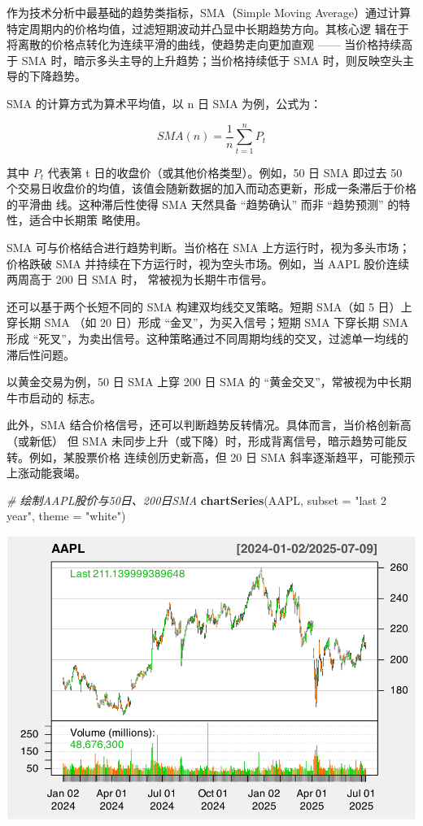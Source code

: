 \documentclass[]{ctexbook}
\newenvironment{Shaded}{\begin{snugshade}}{\end{snugshade}}
\newcommand{\AttributeTok}[1]{\textcolor[rgb]{0.13,0.29,0.53}{#1}}
\newcommand{\CommentTok}[1]{\textcolor[rgb]{0.56,0.35,0.01}{\textit{#1}}}
\newcommand{\FunctionTok}[1]{\textcolor[rgb]{0.13,0.29,0.53}{\textbf{#1}}}
\newcommand{\NormalTok}[1]{#1}
\newcommand{\StringTok}[1]{\textcolor[rgb]{0.31,0.60,0.02}{#1}}
\begin{document}
作为技术分析中最基础的趋势类指标，SMA（Simple Moving Average）通过计算特定周期内的价格均值，过滤短期波动并凸显中长期趋势方向。其核心逻
辑在于将离散的价格点转化为连续平滑的曲线，使趋势走向更加直观 ------ 当价格持续高于 SMA 时，暗示多头主导的上升趋势；当价格持续低于 SMA 时，则反映空头主导的下降趋势。

SMA 的计算方式为算术平均值，以 n 日 SMA 为例，公式为：

\[
SMA(n) = \frac{1}{n}\sum_{t=1}^nP_t
\]

其中 \(P_t\) 代表第 t 日的收盘价（或其他价格类型）。例如，50 日 SMA 即过去 50 个交易日收盘价的均值，该值会随新数据的加入而动态更新，形成一条滞后于价格的平滑曲
线。这种滞后性使得 SMA 天然具备 ``趋势确认'' 而非 ``趋势预测'' 的特性，适合中长期策
略使用。

SMA 可与价格结合进行趋势判断。当价格在 SMA 上方运行时，视为多头市场；价格跌破 SMA 并持续在下方运行时，视为空头市场。例如，当 AAPL 股价连续两周高于 200 日 SMA 时，
常被视为长期牛市信号。

还可以基于两个长短不同的 SMA 构建双均线交叉策略。短期 SMA（如 5 日）上穿长期 SMA
（如 20 日）形成 ``金叉''，为买入信号；短期 SMA 下穿长期 SMA 形成 ``死叉''，为卖出信号。这种策略通过不同周期均线的交叉，过滤单一均线的滞后性问题。

以黄金交易为例，50 日 SMA 上穿 200 日 SMA 的 ``黄金交叉''，常被视为中长期牛市启动的
标志。

此外，SMA 结合价格信号，还可以判断趋势反转情况。具体而言，当价格创新高（或新低）
但 SMA 未同步上升（或下降）时，形成背离信号，暗示趋势可能反转。例如，某股票价格
连续创历史新高，但 20 日 SMA 斜率逐渐趋平，可能预示上涨动能衰竭。

\begin{Shaded}
\begin{Highlighting}[]
\CommentTok{\# 绘制AAPL股价与50日、200日SMA}
\FunctionTok{chartSeries}\NormalTok{(AAPL, }\AttributeTok{subset =} \StringTok{"last 2 year"}\NormalTok{, }\AttributeTok{theme =} \StringTok{"white"}\NormalTok{)}
\end{Highlighting}
\end{Shaded}

\includegraphics[width=0.9\linewidth]{quantmod_files/figure-latex/sma-1}
\end{document}
